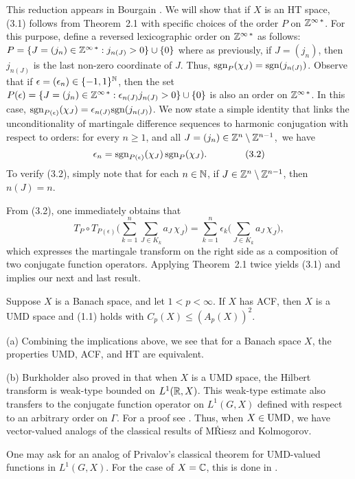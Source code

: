 This reduction appears in Bourgain \cite{6}.  We will show that if $X$ is 
an HT space, (3.1) follows from Theorem~2.1 with specific choices of the 
order $P$ on ${\Bbb Z^{\infty\,\ast}}$.  For this purpose, define a reversed lexicographic 
order on ${\Bbb Z^{\infty\,\ast}}$ as
follows:
$P=\{J=(j_n)\in{\Bbb Z^{\infty\,\ast}}:j_{n(J)}>0\}\cup\{0 \}$
where as previously, if $J=(j_n)$, then $j_{n(J)}$ is the last
non-zero coordinate of
$J$. Thus, $\text{sgn}_P(\chi_J)=\text{sgn}(j_{n(J)})$. Observe that
if $\epsilon=(\epsilon_n)\in\{-1,1\}^\Bbb N$,
then the set
$P(\epsilon)=
\{J=(j_n)\in{\Bbb Z^{\infty\,\ast}}:\epsilon_{n(J)}j_{n(J)}>0\}\cup\{0 \}$
is also an order on ${\Bbb Z^{\infty\,\ast}}$. In this case, 
$\text{sgn}_{P(\epsilon)}(\chi_J)=\epsilon_{n(J)}\text{sgn}(j_{n(J)})$.
We now state a simple identity that links the unconditionality of 
martingale difference sequences to harmonic conjugation with respect to 
orders:  for every $n\geq 1$, and all $J=(j_n)\in\Bbb Z^n\setminus\Bbb Z^{n-
1}$,\ we have
$$\epsilon_n  =\text{sgn}_{P(\epsilon)}(\chi_J)\,
\text{sgn}_{P}(\chi_J).\qquad
\tag{3.2}$$
To verify (3.2), simply note that for each $n\in\Bbb N$, 
if $J\in\Bbb Z^n\setminus\Bbb Z^{n-1}$, then $n(J)=n$.


From (3.2), one immediately obtains that
$$
T_P \circ T_{P(\epsilon)} \bigg( \sum_{k=1}^n \sum_{J\in K_k}
a_J\,\chi_J \bigg)
=
\sum_{k=1}^n\epsilon_k\bigg(\sum_{J\in
K_k}a_J\,\chi_J
\bigg),
\tag{3.3} $$
which expresses the martingale transform on the right side as a 
composition of two conjugate function operators. 
Applying Theorem~2.1 twice yields (3.1) and implies 
our next and last result.
 
 Suppose $X$ is a Banach space, and
let $1<p<\infty$. If $X$ has ACF,
then $X$ is a UMD space and (1.1) holds with
$C_p(X) \leq (A_p(X) )^2$.\endproclaim
 
 (a) Combining the implications above, we see that 
for a Banach space $X$, the properties
UMD, ACF, and HT are equivalent. 

(b) Burkholder also proved in \cite{8} that when $X$ is a UMD space,
the Hilbert transform is weak-type bounded on $L^1(\Bbb R,X)$.
This weak-type estimate also transfers to the conjugate function operator 
on $L^1(G,X)$ defined with respect to an arbitrary order on $\Gamma$.
For a proof see \cite{13}.
Thus, when $X\in\text{UMD}$, we have vector-valued analogs of
the classical results of M\. Riesz and Kolmogorov. 

One may ask for an analog of Privalov's classical theorem for 
UMD-valued functions in $L^1(G,X)$. For the case of $X=\Bbb C$, this is done 
in \cite{4}. 
 
